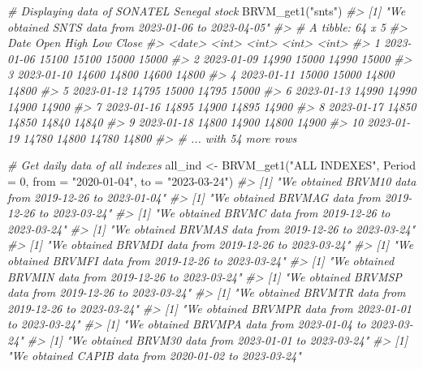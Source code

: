 \documentclass[
]{article}
\newenvironment{Shaded}{\begin{snugshade}}{\end{snugshade}}
\newcommand{\AttributeTok}[1]{\textcolor[rgb]{0.77,0.63,0.00}{#1}}
\newcommand{\CommentTok}[1]{\textcolor[rgb]{0.56,0.35,0.01}{\textit{#1}}}
\newcommand{\DecValTok}[1]{\textcolor[rgb]{0.00,0.00,0.81}{#1}}
\newcommand{\FunctionTok}[1]{\textcolor[rgb]{0.00,0.00,0.00}{#1}}
\newcommand{\NormalTok}[1]{#1}
\newcommand{\OtherTok}[1]{\textcolor[rgb]{0.56,0.35,0.01}{#1}}
\newcommand{\StringTok}[1]{\textcolor[rgb]{0.31,0.60,0.02}{#1}}
\begin{document}
\begin{Shaded}
\begin{Highlighting}[]
\CommentTok{\#\textquotesingle{} Displaying data of SONATEL Senegal stock}
\FunctionTok{BRVM\_get1}\NormalTok{(}\StringTok{"snts"}\NormalTok{)}
\CommentTok{\#\textgreater{} [1] "We obtained SNTS data from 2023{-}01{-}06 to 2023{-}04{-}05"}
\CommentTok{\#\textgreater{} \# A tibble: 64 x 5}
\CommentTok{\#\textgreater{}    Date        Open  High   Low Close}
\CommentTok{\#\textgreater{}    \textless{}date\textgreater{}     \textless{}int\textgreater{} \textless{}int\textgreater{} \textless{}int\textgreater{} \textless{}int\textgreater{}}
\CommentTok{\#\textgreater{}  1 2023{-}01{-}06 15100 15100 15000 15000}
\CommentTok{\#\textgreater{}  2 2023{-}01{-}09 14990 15000 14990 15000}
\CommentTok{\#\textgreater{}  3 2023{-}01{-}10 14600 14800 14600 14800}
\CommentTok{\#\textgreater{}  4 2023{-}01{-}11 15000 15000 14800 14800}
\CommentTok{\#\textgreater{}  5 2023{-}01{-}12 14795 15000 14795 15000}
\CommentTok{\#\textgreater{}  6 2023{-}01{-}13 14990 14990 14900 14900}
\CommentTok{\#\textgreater{}  7 2023{-}01{-}16 14895 14900 14895 14900}
\CommentTok{\#\textgreater{}  8 2023{-}01{-}17 14850 14850 14840 14840}
\CommentTok{\#\textgreater{}  9 2023{-}01{-}18 14800 14900 14800 14900}
\CommentTok{\#\textgreater{} 10 2023{-}01{-}19 14780 14800 14780 14800}
\CommentTok{\#\textgreater{} \# ... with 54 more rows}

\CommentTok{\# Get daily data of all indexes}
\NormalTok{all\_ind }\OtherTok{\textless{}{-}} \FunctionTok{BRVM\_get1}\NormalTok{(}\StringTok{"ALL INDEXES"}\NormalTok{, }\AttributeTok{Period =} \DecValTok{0}\NormalTok{, }\AttributeTok{from =} \StringTok{"2020{-}01{-}04"}\NormalTok{, }\AttributeTok{to =} \StringTok{"2023{-}03{-}24"}\NormalTok{) }
\CommentTok{\#\textgreater{} [1] "We obtained BRVM10 data from 2019{-}12{-}26 to 2023{-}01{-}04"}
\CommentTok{\#\textgreater{} [1] "We obtained BRVMAG data from 2019{-}12{-}26 to 2023{-}03{-}24"}
\CommentTok{\#\textgreater{} [1] "We obtained BRVMC data from 2019{-}12{-}26 to 2023{-}03{-}24"}
\CommentTok{\#\textgreater{} [1] "We obtained BRVMAS data from 2019{-}12{-}26 to 2023{-}03{-}24"}
\CommentTok{\#\textgreater{} [1] "We obtained BRVMDI data from 2019{-}12{-}26 to 2023{-}03{-}24"}
\CommentTok{\#\textgreater{} [1] "We obtained BRVMFI data from 2019{-}12{-}26 to 2023{-}03{-}24"}
\CommentTok{\#\textgreater{} [1] "We obtained BRVMIN data from 2019{-}12{-}26 to 2023{-}03{-}24"}
\CommentTok{\#\textgreater{} [1] "We obtained BRVMSP data from 2019{-}12{-}26 to 2023{-}03{-}24"}
\CommentTok{\#\textgreater{} [1] "We obtained BRVMTR data from 2019{-}12{-}26 to 2023{-}03{-}24"}
\CommentTok{\#\textgreater{} [1] "We obtained BRVMPR data from 2023{-}01{-}01 to 2023{-}03{-}24"}
\CommentTok{\#\textgreater{} [1] "We obtained BRVMPA data from 2023{-}01{-}04 to 2023{-}03{-}24"}
\CommentTok{\#\textgreater{} [1] "We obtained BRVM30 data from 2023{-}01{-}01 to 2023{-}03{-}24"}
\CommentTok{\#\textgreater{} [1] "We obtained CAPIB data from 2020{-}01{-}02 to 2023{-}03{-}24"}


\end{Highlighting}
\end{Shaded}
\end{document}

